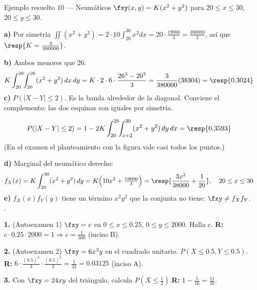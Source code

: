\begin{ejemplo}{Ejemplo resuelto 10 --- Neum\'aticos }
$\fxy(x,y)=K(x^2+y^2)$ para $20\le x\le30$, $20\le y\le30$.

\textbf{a)} Por simetr\'ia $\iint(x^2+y^2)=2\cdot10\int_{20}^{30}x^2dx=20\cdot\tfrac{19000}{3}=\tfrac{380000}{3}$, as\'i que
$\resp{K=\tfrac{3}{380000}}$.

\textbf{b)} Ambos menores que 26:
\[
K\int_{20}^{26}\!\!\int_{20}^{26}(x^2+y^2)\,dx\,dy=K\cdot2\cdot6\cdot\frac{26^3-20^3}{3}=\frac{3}{380000}(38304)=\resp{0.3024}
\]
\textbf{c)} $P(|X-Y|\le2)$. Es la banda alrededor de la diagonal. Conviene el complemento: las dos esquinas son
iguales por simetr\'ia.

\begin{minipage}{0.3\textwidth}
\end{minipage}
\begin{minipage}{0.68\textwidth}
\[
P(|X-Y|\le2)=1-2K\int_{20}^{28}\!\!\int_{x+2}^{30}(x^2+y^2)\,dy\,dx=\resp{0.3593}
\]
(En el examen el planteamiento con la figura vale casi todos los puntos.)
\end{minipage}

\textbf{d)} Marginal del neum\'atico derecho:
\[
f_X(x)=K\int_{20}^{30}(x^2+y^2)\,dy=K\Big(10x^2+\tfrac{19000}{3}\Big)=\resp{\frac{3x^2}{38000}+\frac1{20}},\quad 20\le x\le30
\]
\textbf{e)} $f_X(x)f_Y(y)$ tiene un t\'ermino $x^2y^2$ que la conjunta no tiene: $\fxy\neq f_Xf_Y$. .
\end{ejemplo}

\begin{mecaniza}
\textbf{1.} (Autoexamen 1) $\fxy=c$ en $0\le x\le0.25$, $0\le y\le2000$. Halla $c$.
\quad\textbf{R:} $c\cdot0.25\cdot2000=1\Rightarrow c=\tfrac1{500}$ (inciso B).

\textbf{2.} (Autoexamen 2) $\fxy=6x^2y$ en el cuadrado unitario. $P(X\le0.5,Y\le0.5)$.
\quad\textbf{R:} $6\cdot\tfrac{(0.5)^3}{3}\cdot\tfrac{(0.5)^2}{2}=\tfrac1{32}=0.03125$ (inciso A).

\textbf{3.} Con $\fxy=24xy$ del tri\'angulo, calcula $P(X\le\tfrac12)$.\quad\textbf{R:} $1-\tfrac{5}{16}=\tfrac{11}{16}$.
\end{mecaniza}

